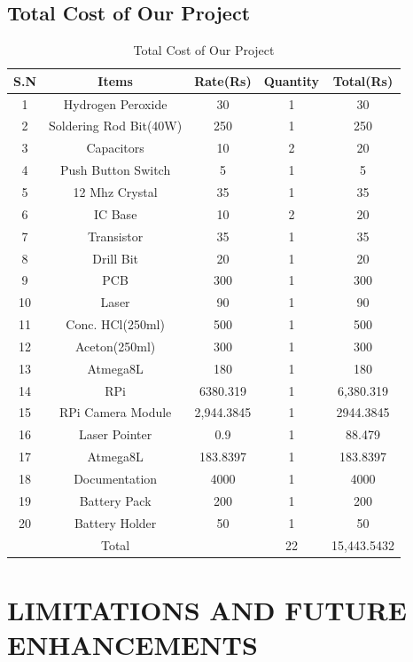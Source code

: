 \documentclass[12pt, a4paper]{article}
\begin{document}
\subsection{Total Cost of Our Project}
\begin{table}[ht]
\begin{tabular}{|c|c|c|c|c|}
\hline
	S.N & Items & Rate(Rs) & Quantity & Total(Rs) \\
\hline
	1 & Hydrogen Peroxide & 30 & 1 & 30 \\
\hline
	2 & Soldering Rod Bit(40W) & 250 & 1 & 250 \\
\hline
	3 & Capacitors & 10 & 2 & 20 \\
\hline
	4 & Push Button Switch & 5 & 1 & 5 \\
\hline
	5 & 12 Mhz Crystal & 35 & 1 & 35 \\
\hline
	6 & IC Base & 10 & 2 & 20 \\
\hline
	7 & Transistor & 35 & 1 & 35 \\
\hline
	8 & Drill Bit & 20 & 1 & 20 \\
\hline
	9 & PCB & 300 & 1 & 300 \\
\hline
	10 & Laser & 90 & 1 & 90 \\
\hline
	11 & Conc. HCl(250ml) & 500 & 1 & 500 \\
\hline
	12 & Aceton(250ml) & 300 & 1 & 300 \\
\hline
	13 & Atmega8L & 180 & 1 & 180 \\
\hline
	14 & RPi & 6380.319 & 1 & 6,380.319 \\
\hline
	15 & RPi Camera Module & 2,944.3845 & 1 & 2944.3845 \\
\hline
	16 & Laser Pointer &  0.9 & 1 & 88.479 \\
\hline 
    17 & Atmega8L & 183.8397 & 1 & 183.8397 \\
\hline
	18 & Documentation &  4000 & 1 & 4000 \\
\hline
	19 & Battery Pack & 200 & 1 & 200 \\
\hline 
    20 & Battery Holder & 50 & 1 & 50 \\
\hline 
	   & Total & & 22 & 15,443.5432\\
\hline	   
\end{tabular}
\caption{Total Cost of Our Project}
\label{tb:sw}
\end{table}
\newpage
\section{LIMITATIONS AND FUTURE ENHANCEMENTS}
\end{document}
